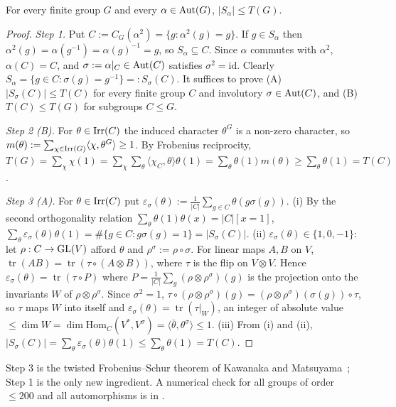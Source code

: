 \begin{theorem}
For every finite group $G$ and every $\alpha\in\operatorname{Aut}(G)$, $|S_\alpha|\le T(G)$.
\end{theorem}
\begin{proof}
\emph{Step 1.} Put $C:=C_G(\alpha^2)=\{g:\alpha^2(g)=g\}$. If $g\in S_\alpha$ then $\alpha^2(g)=\alpha(g^{-1})=
\alpha(g)^{-1}=g$, so $S_\alpha\subseteq C$. Since $\alpha$ commutes with $\alpha^2$, $\alpha(C)=C$, and
$\sigma:=\alpha|_C\in\operatorname{Aut}(C)$ satisfies $\sigma^2=\mathrm{id}$. Clearly $S_\alpha=\{g\in C:\sigma(g)=g^{-1}\}=:
S_\sigma(C)$. It suffices to prove (A) $|S_\sigma(C)|\le T(C)$ for every finite group $C$ and involutory
$\sigma\in\operatorname{Aut}(C)$, and (B) $T(C)\le T(G)$ for subgroups $C\le G$.

\emph{Step 2 (B).} For $\theta\in\operatorname{Irr}(C)$ the induced character $\theta^G$ is a non-zero character, so
$m(\theta):=\sum_{\chi\in\operatorname{Irr}(G)}\langle\chi,\theta^G\rangle\ge 1$. By Frobenius reciprocity,
$T(G)=\sum_\chi\chi(1)=\sum_\chi\sum_\theta\langle\chi_C,\theta\rangle\theta(1)=\sum_\theta\theta(1)m(\theta)\ge
\sum_\theta\theta(1)=T(C)$.

\emph{Step 3 (A).} For $\theta\in\operatorname{Irr}(C)$ put $\varepsilon_\sigma(\theta):=\frac1{|C|}\sum_{g\in C}\theta(g\sigma(g))$.
(i) By the second orthogonality relation $\sum_\theta\theta(1)\theta(x)=|C|[x=1]$,
$\sum_\theta\varepsilon_\sigma(\theta)\theta(1)=\#\{g\in C:g\sigma(g)=1\}=|S_\sigma(C)|$.
(ii) $\varepsilon_\sigma(\theta)\in\{1,0,-1\}$: let $\rho:C\to\mathrm{GL}(V)$ afford $\theta$ and $\rho^\sigma:=\rho\circ\sigma$.
For linear maps $A,B$ on $V$, $\operatorname{tr}(AB)=\operatorname{tr}(\tau\circ(A\otimes B))$, where $\tau$ is the
flip on $V\otimes V$. Hence $\varepsilon_\sigma(\theta)=\operatorname{tr}(\tau\circ P)$ where
$P=\frac1{|C|}\sum_g(\rho\otimes\rho^\sigma)(g)$ is the projection onto the invariants $W$ of $\rho\otimes\rho^\sigma$.
Since $\sigma^2=1$, $\tau\circ(\rho\otimes\rho^\sigma)(g)=(\rho\otimes\rho^\sigma)(\sigma(g))\circ\tau$, so $\tau$
maps $W$ into itself and $\varepsilon_\sigma(\theta)=\operatorname{tr}(\tau|_W)$, an integer of absolute value
$\le\dim W=\dim\mathrm{Hom}_C(V^*,V^\sigma)=\langle\bar\theta,\theta^\sigma\rangle\le 1$.
(iii) From (i) and (ii), $|S_\sigma(C)|=\sum_\theta\varepsilon_\sigma(\theta)\theta(1)\le\sum_\theta\theta(1)=T(C)$.
\end{proof}
Step 3 is the twisted Frobenius--Schur theorem of Kawanaka and Matsuyama~\cite{KM}; Step 1 is the only new
ingredient. A numerical check for all groups of order $\le 200$ and all automorphisms is in .

